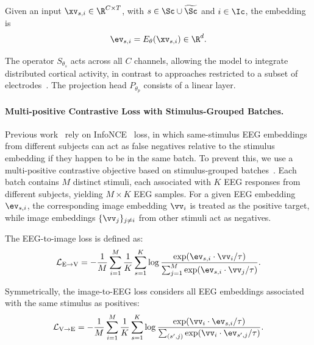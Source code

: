 \documentclass{article}
\begin{document}
Given an input $\xv_{s,i} \in \R^{C \times T}$, with $s\in \Sc \cup \widetilde{\Sc}$ and $i \in \Ic$, the embedding is
\begin{equation}
\ev_{s,i} = E_\theta(\xv_{s,i}) \in \R^d.
\end{equation}

The operator $S_{\theta_s}$ acts across all $C$ channels, allowing the model to integrate distributed cortical activity, in contrast to approaches restricted to a subset of electrodes~\cite{du2025shallow}.
The projection head $P_{\theta_p}$ consists of a linear layer.
 
\paragraph{Multi-positive Contrastive Loss with Stimulus-Grouped Batches.}
Previous work~\cite{song2024nice,li2024atm,wu2025ubp,zhang2025neurobridge,du2025shallow} rely on InfoNCE~\cite{oord2019cpc} loss, in which same-stimulus EEG embeddings from different subjects can act as false negatives relative to the stimulus embedding if they happen to be in the same batch.  To prevent this, we use a multi-positive contrastive objective based on stimulus-grouped batches~\cite{khosla2020supcon}. Each batch contains $M$ distinct stimuli, each associated with $K$ EEG responses from different subjects, yielding $M \times K$ EEG samples. 
For a given EEG embedding $\ev_{s,i}$, the corresponding image embedding $\vv_{i}$ is treated as the positive target, while image embeddings $\{\vv_{j}\}_{j \neq i}$ from other stimuli act as negatives.

The EEG-to-image loss is defined as:
\begin{equation}\label{eq:loss1}
\mathcal{L}_{\mathrm{E \to V}} =
-\frac{1}{M} \sum_{i=1}^{M} \frac{1}{K}\sum_{s=1}^{K}
\log 
\frac{\exp(\ev_{s,i} \cdot \vv_{i} / \tau)}
{\sum_{j=1}^{M} \exp(\ev_{s,i} \cdot \vv_{j} / \tau)}.
\end{equation}

Symmetrically, the image-to-EEG loss considers all EEG embeddings associated with the same stimulus as positives:
\begin{equation}\label{eq:loss2}
\mathcal{L}_{\mathrm{V \to E}} =
-\frac{1}{M} \sum_{i=1}^{M}
\frac{1}{K} \sum_{s=1}^{K}
\log 
\frac{\exp(\vv_{i} \cdot \ev_{s,i} / \tau)}
{\sum_{(s',j)} \exp(\vv_{i} \cdot \ev_{s',j} / \tau)}.
\end{equation}
\end{document}

